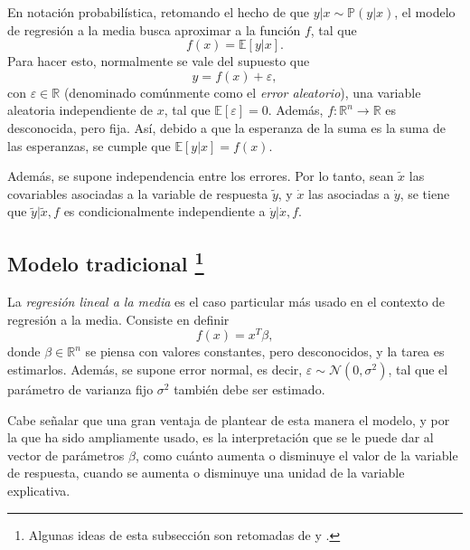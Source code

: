En notaci\'on probabil\'istica, retomando el hecho de que $y|x \sim \mathbb{P}(y|x)$, el modelo de regresi\'on a la media busca aproximar a la funci\'on $f$, tal que 
\begin{equation*}
    f(x) = \mathbb{E}[y|x].
\end{equation*}
Para hacer esto, normalmente se vale del supuesto que
\begin{equation*}
    y = f(x) + \varepsilon,
\end{equation*}
con $\varepsilon \in \mathbb{R}$ (denominado com\'unmente como el \textit{error aleatorio}), una variable aleatoria independiente de $x$, tal que $\mathbb{E}[\varepsilon] = 0$. Adem\'as, $f: \mathbb{R}^n \rightarrow \mathbb{R}$ es desconocida, pero fija. As\'i, debido a que la esperanza de la suma es la suma de las esperanzas, se cumple que $\mathbb{E}[y|x] = f(x)$.

Adem\'as, se supone independencia entre los errores. Por lo tanto, sean $\tilde{x}$ las covariables asociadas a la variable de respuesta $\tilde{y}$, y $\dot{x}$ las asociadas a $\dot{y}$, se tiene que $\tilde{y} | \tilde{x}, f$ es condicionalmente independiente a $\dot{y} | \dot{x}, f$.

\subsection[Modelo tradicional]{
    Modelo tradicional
    \footnote{Algunas ideas de esta subsecci\'on son retomadas de \cite{Denison_BayesMethods} y \cite{Bannerjee_BayLinMod}.}
} \label{trad_mean_reg}

La \textit{regresi\'on lineal a la media} es el caso particular m\'as usado en el contexto de regresi\'on a la media. Consiste en definir
\begin{equation*}
    f(x) = x^T\beta,
\end{equation*}
donde $\beta \in \mathbb{R}^n$ se piensa con valores constantes, pero desconocidos, y la tarea es estimarlos. Adem\'as, se supone error normal, es decir, $\varepsilon \sim \mathcal{N}(0,\sigma^2)$, tal que el par\'ametro de varianza fijo $\sigma^2$ tambi\'en debe ser estimado.

Cabe señalar que una gran ventaja de plantear de esta manera el modelo, y por la que ha sido ampliamente usado, es la interpretaci\'on que se le puede dar al vector de par\'ametros $\beta$, como cu\'anto aumenta o disminuye el valor de la variable de respuesta, cuando se aumenta o disminuye una unidad de la variable explicativa.

